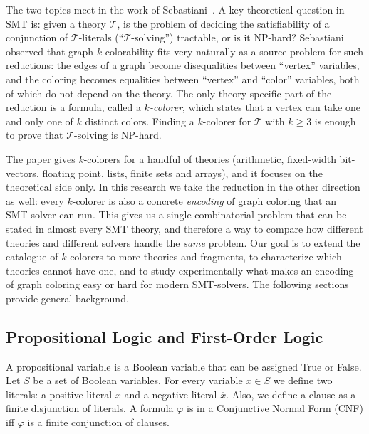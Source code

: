 \documentclass[12pt,a4paper]{article}
\newcommand{\T}{\mathcal{T}}
\theoremstyle{definition}
\begin{document}
The two topics meet in the work of Sebastiani~\cite{Sebastiani16}. A key
theoretical question in SMT is: given a theory $\T$, is the problem of deciding
the satisfiability of a conjunction of $\T$-literals (``$\T$-solving'')
tractable, or is it NP-hard? Sebastiani observed that graph $k$-colorability fits
very naturally as a source problem for such reductions: the edges of a graph
become disequalities between ``vertex'' variables, and the coloring becomes
equalities between ``vertex'' and ``color'' variables, both of which do not depend
on the theory. The only theory-specific part of the reduction is a formula, called
a \emph{$k$-colorer}, which states that a vertex can take one and only one of $k$
distinct colors. Finding a $k$-colorer for $\T$ with $k \geq 3$ is enough to prove
that $\T$-solving is NP-hard.

The paper gives $k$-colorers for a handful of theories (arithmetic, fixed-width
bit-vectors, floating point, lists, finite sets and arrays), and it focuses on the
theoretical side only. In this research we take the reduction in the other
direction as well: every $k$-colorer is also a concrete \emph{encoding} of graph
coloring that an SMT-solver can run. This gives us a single combinatorial problem
that can be stated in almost every SMT theory, and therefore a way to compare how
different theories and different solvers handle the \emph{same} problem. Our goal
is to extend the catalogue of $k$-colorers to more theories and fragments, to
characterize which theories cannot have one, and to study experimentally what makes
an encoding of graph coloring easy or hard for modern SMT-solvers. The following
sections provide general background.

\subsection{Propositional Logic and First-Order Logic}

A propositional variable is a Boolean variable that can be assigned True or
False. Let $S$ be a set of Boolean variables. For every variable $x \in S$ we
define two literals: a positive literal $x$ and a negative literal $\overline{x}$.
Also, we define a clause as a finite disjunction of literals. A formula $\varphi$
is in a Conjunctive Normal Form (CNF) iff $\varphi$ is a finite conjunction of
clauses.
\end{document}
